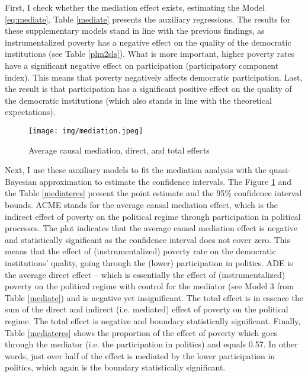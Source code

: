 \documentclass[a4paper, 12pt]{article}
\begin{document}
    \noindent First, I check whether the mediation effect exists, estimating the Model \eqref{eq:mediate}. Table \ref{mediate} presents the auxiliary regressions. The results for these supplementary models stand in line with the previous findings, as instrumentalized poverty has a negative effect on the quality of the democratic institutions (see Table \ref{plm2sls}). What is more important, higher poverty rates have a significant negative effect on participation (participatory component index). This means that poverty negatively affects democratic participation. Last, the result is that participation has a significant positive effect on the quality of the democratic institutions (which also stands in line with the theoretical expectations).
    \\
     \begin{figure}[httbt]
        \centering
        \texttt{[image: img/mediation.jpeg]}
        \caption{Average causal mediation, direct, and total effects}
        \label{fig:mediate}
    \end{figure}
    
    \noindent Next, I use these auxiliary models to fit the mediation analysis with the quasi-Bayesian approximation to estimate the confidence intervals. The Figure \ref{fig:mediate} and the Table \ref{mediateres} present the point estimate and the 95\% confidence interval bounds. ACME stands for the average causal mediation effect, which is the indirect effect of poverty on the political regime through participation in political processes. The plot indicates that the average causal mediation effect is negative and statistically significant as the confidence interval does not cover zero. This means that the effect of (instrumentalized) poverty rate on the democratic institutions' quality, going through the (lower) participation in politics. ADE is the average direct effect -- which is essentially the effect of (instrumentalized) poverty on the political regime with control for the mediator (see Model 3 from Table \ref{mediate}) and is negative yet insignificant. The total effect is in essence the sum of the direct and indirect (i.e. mediated) effect of poverty on the political regime. The total effect is negative and boundary statistically significant. Finally, Table \ref{mediateres} shows the proportion of the effect of poverty which goes through the mediator (i.e. the participation in politics) and equals 0.57. In other words, just over half of the effect is mediated by the lower participation in politics, which again is the boundary statistically significant. 
    
\end{document}
